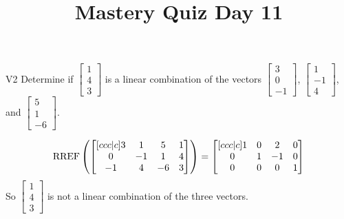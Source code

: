 \documentclass{sbgLAquiz}
\title{Mastery Quiz Day 11 }
\begin{document}
\begin{problem}{V2} Determine if $\begin{bmatrix} 1 \\ 4 \\ 3 \end{bmatrix}$ is a linear combination of the vectors $\begin{bmatrix} 3 \\ 0 \\ -1 \end{bmatrix}$, $\begin{bmatrix} 1 \\ -1 \\ 4 \end{bmatrix}$, and $\begin{bmatrix} 5 \\ 1 \\  -6 \end{bmatrix}$.
\end{problem}
\begin{solution}
$$\operatorname{RREF}\left(\begin{bmatrix}[ccc|c] 3 & 1 & 5 & 1 \\ 0 & -1 & 1 & 4 \\ -1 & 4 & -6 & 3 \end{bmatrix} \right) = \begin{bmatrix}[ccc|c] 1 & 0 & 2 & 0 \\ 0 & 1 & -1 & 0 \\ 0 & 0 & 0 & 1 \end{bmatrix}$$
So $\begin{bmatrix} 1 \\ 4 \\ 3 \end{bmatrix}$ is not a linear combination of the three vectors.
\end{solution}
\end{document}
